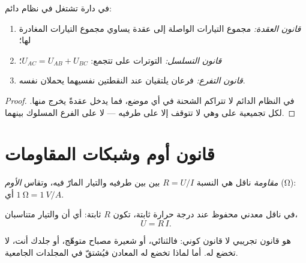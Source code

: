 \begin{proposition}\label{prop:g11:circuits-and-power:laws}
في دارة تشتغل في نظام دائم:
\begin{enumerate}
  \item \emph{قانون العقدة:} مجموع التيارات الواصلة إلى عقدة يساوي
        مجموع التيارات المغادرة لها؛
  \item \emph{قانون التسلسل:} التوترات على  تتجمع:
        $U_{AC} = U_{AB} + U_{BC}$؛
  \item \emph{قانون التفرع:} فرعان يلتقيان عند النقطتين نفسيهما
        يحملان  نفسه.
\end{enumerate}
\end{proposition}

\begin{proof}
في النظام الدائم لا تتراكم الشحنة في أي موضع، فما يدخل
عقدةً يخرج منها.  لكل  تجميعية على  وهي
لا تتوقف إلا على طرفيه --- لا على الفرع المسلوك بينهما.
\end{proof}

\section{قانون أوم وشبكات المقاومات}

\begin{definition}[المقاومة]\label{def:g11:circuits-and-power:resistance}
\emph{مقاومة} ناقل هي النسبة
$R = U/I$ بين  بين طرفيه والتيار المارّ فيه، وتقاس 
\emph{الأوم} (\unit{\ohm}): أي $\qty{1}{\ohm} = \qty{1}{V/A}$.
\end{definition}

\begin{proposition}\label{prop:g11:circuits-and-power:ohm}
في ناقل معدني محفوظ عند درجة حرارة ثابتة، تكون $R$ ثابتة:
أي أن  والتيار متناسبان،
\[ U = R\,I . \]
\end{proposition}
\admitted

\begin{remark}\label{rem:g11:circuits-and-power:ohm-limits}
هو قانون تجريبي لا قانون كوني: فالثنائي، أو شعيرة مصباح متوهّج،
أو جلدك أنت، لا تخضع له. أما لماذا تخضع له المعادن فيُشتقّ في
المجلدات الجامعية.
\end{remark}

